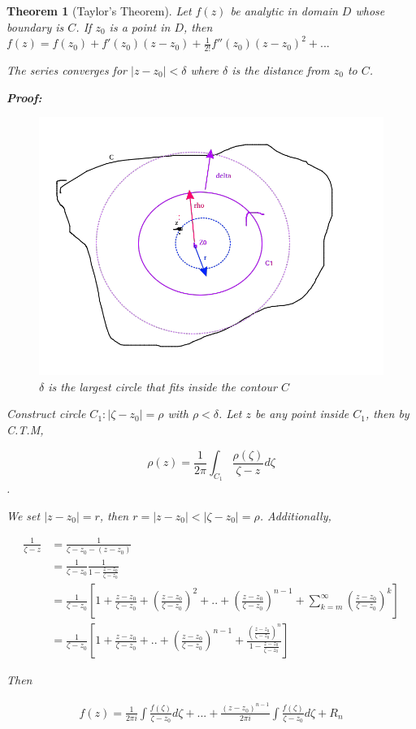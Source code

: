 \documentclass{article}
\newtheorem{theorem}{Theorem}[section]
\theoremstyle{definition}
\begin{document}
\begin{theorem}[Taylor's Theorem]
Let $f(z)$ be analytic in domain $D$ whose boundary is $C$. If $z_0$ is a point in $D$, then $f(z) = f(z_0) + f'(z_0)(z-z_0) + \frac{1}{2!} f''(z_0) (z-z_0)^2+...$

The series converges for $|z-z_0|<\delta$ where $\delta$ is the distance from $z_0$ to $C$. 

\textbf{Proof:}
\begin{figure}[H]
	\centering
	\includegraphics[width=0.5\linewidth]{disc}
	\caption{$\delta$ is the largest circle that fits inside the contour $C$}
	\label{fig:disk}
\end{figure}

Construct circle $C_1:|\zeta - z_0| = \rho$ with $\rho < \delta$. Let $z$ be any point inside $C_1$, then by C.T.M, 

$$\rho(z) = \frac{1}{2 \pi} \int_{C_1} \frac{\rho(\zeta)}{\zeta - z} d\zeta$$.

We set $|z-z_0| = r$, then $ r = |z-z_0|  < |\zeta - z_0| = \rho$. Additionally, 

\begin{align*}
\frac{1}{\zeta - z} &= \frac{1}{\zeta - z_0 - (z - z_0)}\\
&= \frac{1}{\zeta - z_0} \frac{1}{1-\frac{z-z_0}{\zeta - z_0}}\\
&= \frac{1}{\zeta - z_0} \left[1 + \frac{z-z_0}{\zeta - z_0} + \left(\frac{z-z_0}{\zeta - z_0}\right)^2 + .. + \left(\frac{z-z_0}{\zeta - z_0}\right)^{n-1} + \sum_{k=m}^\infty \left(\frac{z-z_0}{\zeta - z_0}\right)^k\right] \\ 
&= \frac{1}{\zeta - z_0} \left[1 + \frac{z-z_0}{\zeta - z_0} + .. + \left(\frac{z-z_0}{\zeta - z_0}\right)^{n-1} + \frac{\left(\frac{z-z_0}{\zeta - z_0}\right)^n}{1-\frac{z-z_0}{\zeta - z_0}}\right]
\end{align*}

Then 

\begin{align*}
f(z) = \frac{1}{2 \pi i } \int \frac{f(\zeta)}{\zeta - z_0} d\zeta + ... + \frac{(z-z_0)^{n-1}}{2 \pi i}\int \frac{f(\zeta)}{\zeta - z_0} d\zeta + R_n
\end{align*}


\end{theorem}
\end{document}
